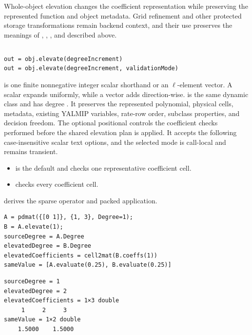 Whole-object elevation changes the coefficient representation while preserving the represented function and object metadata. Grid refinement and other protected storage transformations remain backend context, and their use preserves the meanings of , , , and  described above.

\subsection{\texorpdfstring{}{elevate}}
\label{sec:pdbase-elevate}

\syntaxhead
\begin{lstlisting}[style=dpsyntax]
out = obj.elevate(degreeIncrement)
out = obj.elevate(degreeIncrement, validationMode)
\end{lstlisting}

\descriptionhead
{} is one finite nonnegative integer scalar shorthand or an $\ell$-element vector. A scalar expands uniformly, while a vector adds direction-wise.  is the same dynamic class and has degree . It preserves the represented polynomial, physical cells, metadata, existing YALMIP variables, rate-row order, subclass properties, and decision freedom. The optional positional  controls the coefficient checks performed before the shared elevation plan is applied. It accepts the following case-insensitive scalar text options, and the selected mode is call-local and remains transient.
\begin{itemize}[leftmargin=*]
    \item {} is the default and checks one representative coefficient cell.
    \item {} checks every coefficient cell.
\end{itemize}
 derives the sparse operator and packed application.

\examplehead
\begin{lstlisting}[style=dpmatlab]
A = pdmat({[0 1]}, {1, 3}, Degree=1);
B = A.elevate(1);
sourceDegree = A.Degree
elevatedDegree = B.Degree
elevatedCoefficients = cell2mat(B.coeffs(1))
sameValue = [A.evaluate(0.25), B.evaluate(0.25)]
\end{lstlisting}
\begin{lstlisting}[style=dpoutput]
sourceDegree = 1
elevatedDegree = 2
elevatedCoefficients = 1×3 double
     1     2     3
sameValue = 1×2 double
    1.5000    1.5000
\end{lstlisting}

